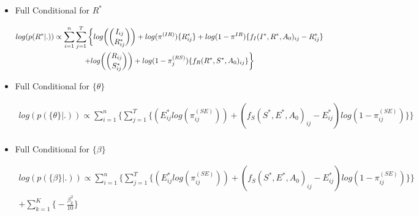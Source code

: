 \documentclass[12pt]{article}
\begin{document}
\begin{itemize}
    \item{Full Conditional for $R^*$}
    \begin{center}
    \begin{multline}
        \displaystyle
        log(p(R^*|.)) \propto \sum_{i=1}^n\sum_{j=1}^T\bigg\{log\bigg(\dbinom{I_{ij}}{R^*_{ij}}\bigg) + log(\pi^{(IR)})\{R^*_{ij}\}
            + log(1-\pi^{IR})\{f_I(I^*, R^*, A_0)_{ij} - R^*_{ij}\}\\
            + log\bigg(\dbinom{R_{ij}}{S^*_{ij}}\bigg) + log(1-\pi_j^{(RS)})\{f_R(R^*, S^*, A_0)_{ij}\}\bigg\}\\ 
    \end{multline}
    \end{center}
    \item{Full Conditional for $\{\theta\}$}
    \begin{center}
    \begin{multline}
        \displaystyle
        log(p(\{\theta\}|.)) \propto \sum_{i=1}^n \bigg\{ \sum_{j=1}^T\Big\{
            (E^*_{ij}log(\pi_{ij}^{(SE)})) + (f_S(S^*, E^*, A_0)_{ij} - E^*_{ij})log(1-\pi_{ij}^{(SE)})\Big\}\bigg\} \\
    \end{multline}
    \end{center}

    \item{Full Conditional for $\{\beta\}$}
    \begin{center}
    \begin{multline}
        \displaystyle
        log(p(\{\beta\}|.)) \propto
            \sum_{i=1}^n \bigg\{ \sum_{j=1}^T\Big\{
            (E^*_{ij}log(\pi_{ij}^{(SE)})) + (f_S(S^*, E^*, A_0)_{ij} - E^*_{ij})log(1-\pi_{ij}^{(SE)})\Big\}\bigg\} \\
             + \sum_{k = 1}^K\bigg\{-\frac{\beta^2_k}{10}\bigg\}
    \end{multline}
    \end{center}


\end{itemize}
\end{document}
